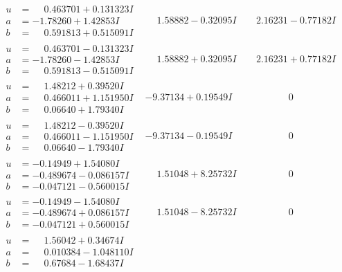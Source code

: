 \documentclass[1p]{elsarticle_modified}
\theoremstyle{definition}
\begin{document}
$$\begin{array}{c|c|c}
\begin{aligned}
u &= \phantom{-}0.463701 + 0.131323 I \\
a &= -1.78260 + 1.42853 I \\
b &= \phantom{-}0.591813 + 0.515091 I\end{aligned}
 & \phantom{-}1.58882 - 0.32095 I & \phantom{-}2.16231 - 0.77182 I \\ \hline\begin{aligned}
u &= \phantom{-}0.463701 - 0.131323 I \\
a &= -1.78260 - 1.42853 I \\
b &= \phantom{-}0.591813 - 0.515091 I\end{aligned}
 & \phantom{-}1.58882 + 0.32095 I & \phantom{-}2.16231 + 0.77182 I \\ \hline\begin{aligned}
u &= \phantom{-}1.48212 + 0.39520 I \\
a &= \phantom{-}0.466011 + 1.151950 I \\
b &= \phantom{-}0.06640 + 1.79340 I\end{aligned}
 & -9.37134 + 0.19549 I & \phantom{-0.000000 } 0 \\ \hline\begin{aligned}
u &= \phantom{-}1.48212 - 0.39520 I \\
a &= \phantom{-}0.466011 - 1.151950 I \\
b &= \phantom{-}0.06640 - 1.79340 I\end{aligned}
 & -9.37134 - 0.19549 I & \phantom{-0.000000 } 0 \\ \hline\begin{aligned}
u &= -0.14949 + 1.54080 I \\
a &= -0.489674 - 0.086157 I \\
b &= -0.047121 - 0.560015 I\end{aligned}
 & \phantom{-}1.51048 + 8.25732 I & \phantom{-0.000000 } 0 \\ \hline\begin{aligned}
u &= -0.14949 - 1.54080 I \\
a &= -0.489674 + 0.086157 I \\
b &= -0.047121 + 0.560015 I\end{aligned}
 & \phantom{-}1.51048 - 8.25732 I & \phantom{-0.000000 } 0 \\ \hline\begin{aligned}
u &= \phantom{-}1.56042 + 0.34674 I \\
a &= \phantom{-}0.010384 - 1.048110 I \\
b &= \phantom{-}0.67684 - 1.68437 I\end{aligned}

\end{array}$$
\end{document}
